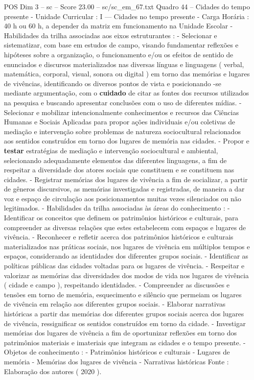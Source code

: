 \begin{textsample}{POS Dim 3 – sc – Score 23.00 – sc/sc\_em\_67.txt}
Quadro 44 – Cidades do tempo presente - Unidade Curricular : I — Cidades no tempo presente - Carga Horária : 40 h ou 60 h, a depender da matriz em funcionamento na Unidade Escolar - Habilidades da trilha associadas aos eixos estruturantes : - Selecionar e sistematizar, com base em estudos de campo, visando fundamentar reflexões e hipóteses sobre a organização, o funcionamento e/ou os efeitos de sentido de enunciados e discursos materializados nas diversas línguas e linguagens ( verbal, matemática, corporal, visual, sonora ou digital ) em torno das memórias e lugares de vivências, identificando os diversos pontos de vista e posicionando -se mediante argumentação, com o \textbf{cuidado} de citar as fontes dos recursos utilizados na pesquisa e buscando apresentar conclusões com o uso de diferentes mídias. - Selecionar e mobilizar intencionalmente conhecimentos e recursos das Ciências Humanas e Sociais Aplicadas para propor ações individuais e/ou coletivas de mediação e intervenção sobre problemas de natureza sociocultural relacionados aos sentidos construídos em torno dos lugares de memória nas cidades. - Propor e \textbf{testar} estratégias de mediação e intervenção sociocultural e ambiental, selecionando adequadamente elementos das diferentes linguagens, a fim de respeitar a diversidade dos atores sociais que constituem e se constituem nas cidades. - Registrar memórias dos lugares de vivência a fim de socializar, a partir de gêneros discursivos, as memórias investigadas e registradas, de maneira a dar voz e espaço de circulação aos posicionamentos muitas vezes silenciados ou não legitimados. - Habilidades da trilha associadas às áreas do conhecimento : - Identificar os conceitos que definem os patrimônios históricos e culturais, para compreender as diversas relações que estes estabelecem com espaços e lugares de vivência. - Reconhecer e refletir acerca dos patrimônios históricos e culturais materializados nas práticas sociais, nos lugares de vivência em múltiplos tempos e espaços, considerando as identidades dos diferentes grupos sociais. - Identificar as políticas públicas das cidades voltadas para os lugares de vivência. - Respeitar e valorizar as memórias das diversidades dos modos de vida nos lugares de vivência ( cidade e campo ), respeitando identidades. - Compreender as discussões e tensões em torno de memória, esquecimento e silêncio que permeiam os lugares de vivência em relação aos diferentes grupos sociais. - Elaborar narrativas históricas a partir das memórias dos diferentes grupos sociais acerca dos lugares de vivência, ressignificar os sentidos construídos em torno da cidade. - Investigar memórias dos lugares de vivência a fim de oportunizar reflexões em torno dos patrimônios materiais e imateriais que integram as cidades e o tempo presente. - Objetos de conhecimento : - Patrimônios históricos e culturais - Lugares de memória - Memórias dos lugares de vivência - Narrativas históricas Fonte : Elaboração dos autores ( 2020 ).

\end{textsample}
